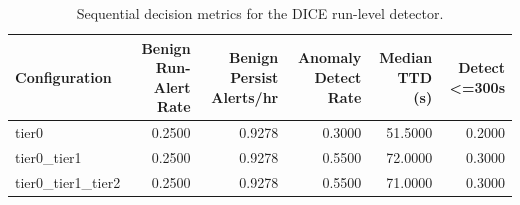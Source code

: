 \begin{table}[t]
\centering
\caption{Sequential decision metrics for the DICE run-level detector.}
\label{tab:dice_sequential_metrics}
\footnotesize
\begin{tabular}{lrrrrr}
\toprule
Configuration & Benign Run-Alert Rate & Benign Persist Alerts/hr & Anomaly Detect Rate & Median TTD (s) & Detect <=300s \\
\midrule
tier0 & 0.2500 & 0.9278 & 0.3000 & 51.5000 & 0.2000 \\
tier0_tier1 & 0.2500 & 0.9278 & 0.5500 & 72.0000 & 0.3000 \\
tier0_tier1_tier2 & 0.2500 & 0.9278 & 0.5500 & 71.0000 & 0.3000 \\
\bottomrule
\end{tabular}

\end{table}

